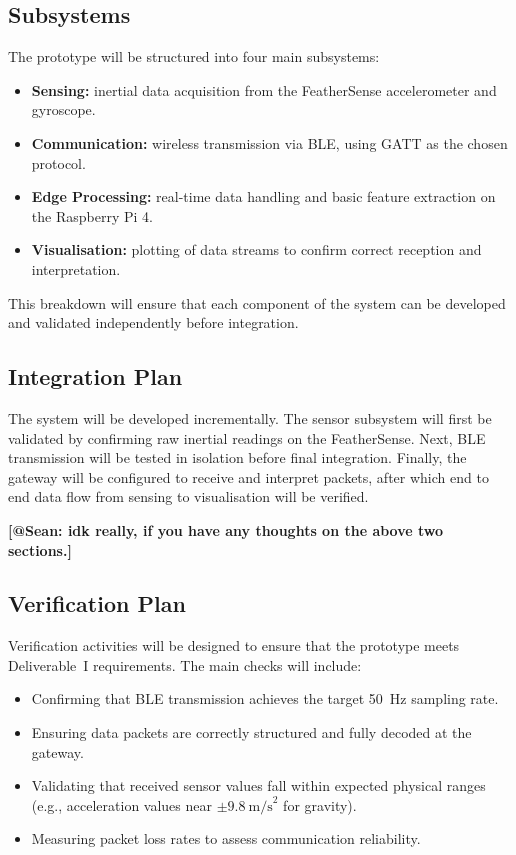 \documentclass[conference]{IEEEtran}
\begin{document}
\subsection{Subsystems}
The prototype will be structured into four main subsystems: 
\begin{itemize}
	\item \textbf{Sensing:} inertial data acquisition from the FeatherSense accelerometer and gyroscope. 
	\item \textbf{Communication:} wireless transmission via BLE, using GATT as the chosen protocol. 
	\item \textbf{Edge Processing:} real-time data handling and basic feature extraction on the Raspberry Pi 4. 
	\item \textbf{Visualisation:} plotting of data streams to confirm correct reception and interpretation. 
\end{itemize}
This breakdown will ensure that each component of the system can be developed and validated independently before integration. 

\subsection{Integration Plan}
The system will be developed incrementally. The sensor subsystem will first be validated by confirming raw inertial readings on the FeatherSense. Next, BLE transmission will be tested in isolation before final integration. Finally, the gateway will be configured to receive and interpret packets, after which end to end data flow from sensing to visualisation will be verified. 


\textbf{[@Sean: idk really, if you have any thoughts on the above two sections.]}

\subsection{Verification Plan}
Verification activities will be designed to ensure that the prototype meets Deliverable~I requirements. The main checks will include:
\begin{itemize}
	\item Confirming that BLE transmission achieves the target 50~Hz sampling rate. 
	\item Ensuring data packets are correctly structured and fully decoded at the gateway. 
	\item Validating that received sensor values fall within expected physical ranges (e.g., acceleration values near $\pm 9.8~\text{m/s}^2$ for gravity). 
	\item Measuring packet loss rates to assess communication reliability. 
\end{itemize}
\end{document}
